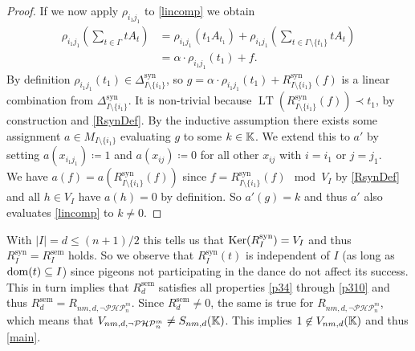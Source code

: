 \documentclass{article}
\newcommand{\PHP}{\ensuremath{\neg \mathcal{PHP}^m_n}\xspace}
\newcommand{\LT}{\operatorname{LT}}
\newcommand{\Rsem}{R^\mathrm{sem}}
\newcommand{\Rsyn}{R^\mathrm{syn}}
\newcommand{\Dsyn}{\Delta^\mathrm{syn}}
\newcommand{\Is}{{I \setminus \{i_1\}}}
\newcommand{\rhoij}{\rho_{i_1 j_1}}
\newcommand{\xij}{{x_{i_1 j_1}}}
\begin{document}
\begin{proof}
    If we now apply $\rhoij$ to \eqref{lincomp} we obtain
    \begin{align*}
        \rhoij\left(\sum_{t \in \Gamma} t A_t\right) &= \rhoij(t_1 A_{t_1}) + \rhoij\left(\sum_{t \in \Gamma \setminus \{t_1\}} t A_t\right)\\
        &= \alpha \cdot \rhoij(t_1) + f.
    \end{align*}
    By definition $\rhoij(t_1) \in \Dsyn_\Is$, so $g = \alpha \cdot \rhoij(t_1) + \Rsyn_\Is(f)$ is a linear combination from $\Dsyn_\Is$. It is non-trivial because $\LT(\Rsyn_\Is(f)) \prec t_1$, by construction and \autoref{RsynDef}. By the inductive assumption there exists some assignment $a \in M_\Is$ evaluating $g$ to some $k \in \mathbb{K}$. We extend this to $a'$ by setting $a(\xij) \coloneqq 1$ and $a(x_{i j}) \coloneqq 0$ for all other $x_{i j}$ with $i = i_1$ or $j = j_1$.\\
    We have $a(f) = a(\Rsyn_\Is(f))$ since $f = \Rsyn_\Is(f) \mod V_I$ by \autoref{RsynDef} and all $h \in V_I$ have $a(h) = 0$ by definition. So $a'(g) = k$ and thus $a'$ also evaluates \eqref{lincomp} to $k \neq 0$.
\end{proof}

With $|I| = d \leq (n + 1) / 2$ this tells us that $\Ker(\Rsyn_I) = V_I$ and thus $\Rsyn_I = \Rsem_I$ holds. So we observe that $\Rsyn_I(t)$ is independent of $I$ (as long as $\operatorname{dom}(t) \subseteq I$) since pigeons not participating in the dance do not affect its success. This in turn implies that $\Rsem_d$ satisfies all properties \eqref{p34} through \eqref{p310} and thus $\Rsem_d = R_{nm, d, \PHP}$. Since $\Rsem_d \neq 0$, the same is true for $R_{nm, d, \PHP}$, which means that $V_{nm, d, \PHP} \neq S_{nm, d}(\KK)$. This implies $1 \not\in V_{nm, d}(\mathbb{K})$ and thus \autoref{main}.

\newpage
\printbibliography
\end{document}
